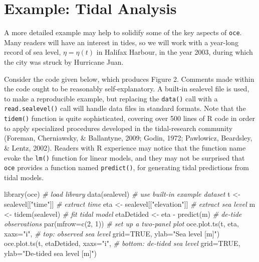 \documentclass[10pt,a4paper,onecolumn]{article}
\newenvironment{Shaded}{\begin{snugshade}}{\end{snugshade}}
\newcommand{\AttributeTok}[1]{\textcolor[rgb]{0.77,0.63,0.00}{#1}}
\newcommand{\CommentTok}[1]{\textcolor[rgb]{0.56,0.35,0.01}{\textit{#1}}}
\newcommand{\ConstantTok}[1]{\textcolor[rgb]{0.00,0.00,0.00}{#1}}
\newcommand{\DecValTok}[1]{\textcolor[rgb]{0.00,0.00,0.81}{#1}}
\newcommand{\FunctionTok}[1]{\textcolor[rgb]{0.00,0.00,0.00}{#1}}
\newcommand{\NormalTok}[1]{#1}
\newcommand{\OtherTok}[1]{\textcolor[rgb]{0.56,0.35,0.01}{#1}}
\newcommand{\SpecialCharTok}[1]{\textcolor[rgb]{0.00,0.00,0.00}{#1}}
\newcommand{\StringTok}[1]{\textcolor[rgb]{0.31,0.60,0.02}{#1}}
\begin{document}
\hypertarget{example-tidal-analysis}{%
\section{Example: Tidal Analysis}\label{example-tidal-analysis}}

A more detailed example may help to solidify some of the key aspects of
\texttt{oce}. Many readers will have an interest in tides, so we will
work with a year-long record of sea level, \(\eta=\eta(t)\) in Halifax
Harbour, in the year 2003, during which the city was struck by Hurricane
Juan.

Consider the code given below, which produces Figure 2. Comments made
within the code ought to be reasonably self-explanatory. A built-in
sealevel file is used, to make a reproducible example, but replacing the
\texttt{data()} call with a \texttt{read.sealevel()} call will handle
data files in standard formats. Note that the \texttt{tidem()} function
is quite sophisticated, covering over 500 lines of R code in order to
apply specialized procedures developed in the tidal-research community
(Foreman, Cherniawsky, \& Ballantyne, 2009; Godin, 1972; Pawlowicz,
Beardsley, \& Lentz, 2002). Readers with R experience may notice that
the function name evoke the \texttt{lm()} function for linear models,
and they may not be surprised that \texttt{oce} provides a function
named \texttt{predict()}, for generating tidal predictions from tidal
models.

\begin{Shaded}
\begin{Highlighting}[]
\FunctionTok{library}\NormalTok{(oce)                           }\CommentTok{\# load library}
\FunctionTok{data}\NormalTok{(sealevel)                         }\CommentTok{\# use built{-}in example dataset}
\NormalTok{t }\OtherTok{\textless{}{-}}\NormalTok{ sealevel[[}\StringTok{"time"}\NormalTok{]]                }\CommentTok{\# extract time}
\NormalTok{eta }\OtherTok{\textless{}{-}}\NormalTok{ sealevel[[}\StringTok{"elevation"}\NormalTok{]]         }\CommentTok{\# extract sea level}
\NormalTok{m }\OtherTok{\textless{}{-}} \FunctionTok{tidem}\NormalTok{(sealevel)                   }\CommentTok{\# fit tidal model}
\NormalTok{etaDetided }\OtherTok{\textless{}{-}}\NormalTok{ eta }\SpecialCharTok{{-}} \FunctionTok{predict}\NormalTok{(m)         }\CommentTok{\# de{-}tide observations}
\FunctionTok{par}\NormalTok{(}\AttributeTok{mfrow=}\FunctionTok{c}\NormalTok{(}\DecValTok{2}\NormalTok{, }\DecValTok{1}\NormalTok{))                     }\CommentTok{\# set up a two{-}panel plot}
\FunctionTok{oce.plot.ts}\NormalTok{(t, eta, }\AttributeTok{xaxs=}\StringTok{"i"}\NormalTok{,          }\CommentTok{\# top: observed sea level}
    \AttributeTok{grid=}\ConstantTok{TRUE}\NormalTok{, }\AttributeTok{ylab=}\StringTok{"Sea level [m]"}\NormalTok{)}
\FunctionTok{oce.plot.ts}\NormalTok{(t, etaDetided, }\AttributeTok{xaxs=}\StringTok{"i"}\NormalTok{,   }\CommentTok{\# bottom: de{-}tided sea level}
    \AttributeTok{grid=}\ConstantTok{TRUE}\NormalTok{, }\AttributeTok{ylab=}\StringTok{"De{-}tided sea level [m]"}\NormalTok{)}
\end{Highlighting}
\end{Shaded}
\end{document}

